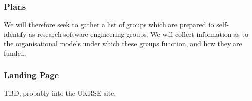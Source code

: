 \subsubsection{Plans}

We will therefore seek to gather a list of groups which are prepared to
self-identify as research software engineering groups. We will collect information
as to the organisational models under which these groups function, and how they
are funded.

\subsubsection{Landing Page}

TBD, probably into the UKRSE site.
